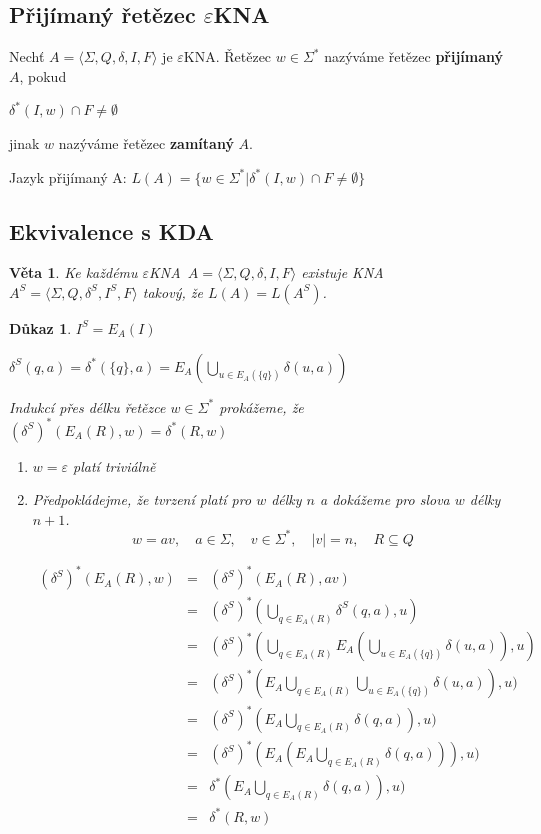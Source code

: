 \documentclass[10pt, a4paper, titlepage]{article}
\theoremstyle{note}
\newtheorem{dukaz}{Důkaz}
\newtheorem{veta}{Věta}
\newcommand{\ekna}{$\varepsilon$KNA}		%
\begin{document}
\subsection{Přijímaný řetězec \ekna}

Nechť $A=\langle\Sigma,Q,\delta,I,F\rangle$ je \ekna. Řetězec $w \in \Sigma^*$ nazýváme řetězec \textbf{přijímaný} $A$, pokud

$\delta^*(I,w) \cap F \neq \emptyset$

jinak $w$ nazýváme řetězec \textbf{zamítaný} $A$.

Jazyk přijímaný A: $L(A) = \lbrace w \in \Sigma^{*} | \delta^{*}(I, w) \cap F \neq \emptyset \rbrace$ 
\subsection{Ekvivalence s KDA}

\begin{veta}
Ke každému \ekna \ $A=\langle\Sigma,Q,\delta,I,F\rangle$ existuje KNA $A^S=\langle\Sigma,Q,\delta^S,I^S,F\rangle$ takový, že $L(A)=L(A^S)$.
\end{veta}
 
 \begin{dukaz}
 $I^S=E_A(I)$
 
 $\delta^S(q,a)=\delta^*(\lbrace q \rbrace , a)= E_A(\bigcup_{u \in E_A(\lbrace q \rbrace )} \delta(u,a))$ 
 
 Indukcí přes délku řetězce $w \in \Sigma^*$ prokážeme, že $ (\delta^{S})^{*} (E_A(R),w)=\delta^*(R,w)$
 
 \begin{enumerate}
 \item
 $w=\varepsilon$ platí triviálně
 \item
 Předpokládejme, že tvrzení platí pro $w$ délky $n$ a dokážeme pro slova $w$ délky $n+1$.
$$
w = av, \quad a \in \Sigma, \quad v \in \Sigma^*, \quad |v|=n, \quad R \subseteq Q
$$ 
 
 \begin{eqnarray*}
	(\delta^{S})^{*} (E_A(R),w) &=& (\delta^{S})^{*} (E_A(R),av) \\
	&=& (\delta^{S})^{*} (\bigcup_{q \in E_A(R)} \delta^S(q,a), u) \\
	&=& (\delta^{S})^{*} (\bigcup_{q \in E_A(R)} E_A(\bigcup_{u \in E_A(\lbrace q \rbrace)} \delta (u,a)),u) \\
	&=& (\delta^{S})^{*} (E_{A} \bigcup_{q \in E_A(R)} \bigcup_{u \in E_A(\lbrace q \rbrace)} \delta (u,a)),u) \\
	&=& (\delta^{S})^{*} (E_{A} \bigcup_{q \in E_A(R)} \delta (q,a)),u) \\
	&=& (\delta^{S})^{*} (E_{A} (E_{A} \bigcup_{q \in E_A(R)} \delta (q,a))),u) \\
	&=& \delta^{*} (E_{A} \bigcup_{q \in E_A(R)} \delta (q,a)),u) \\
	&=& \delta^{*} (R, w)
 \end{eqnarray*}
 \end{enumerate} 
 \end{dukaz}
\end{document}
